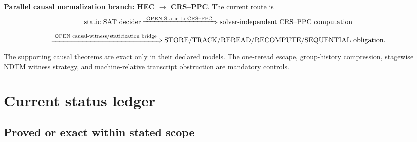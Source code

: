 \documentclass[11pt]{article}
\begin{document}
\begin{candidatebox}
\textbf{Parallel causal normalization branch: HEC \(\rightarrow\) CRS--PPC.}
The current route is
\[
\text{static SAT decider}
\xRightarrow{\text{ OPEN Static-to-CRS--PPC }}
\text{solver-independent CRS--PPC computation}
\]
\[
\xRightarrow{\text{ OPEN causal-witness/staticization bridge }}
\text{STORE/TRACK/REREAD/RECOMPUTE/SEQUENTIAL obligation}.
\]
The supporting causal theorems are exact only in their declared models. The one-reread escape,
group-history compression, stagewise NDTM witness strategy, and machine-relative transcript
obstruction are mandatory controls.
\end{candidatebox}

\section{Current status ledger}

\subsection{Proved or exact within stated scope}
\end{document}
